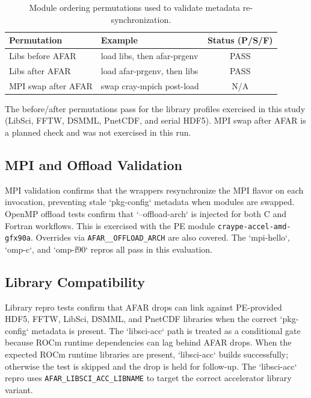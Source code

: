 \begin{table}[t]
  \centering
  \small
  \setlength{\tabcolsep}{4pt}
  \caption{Module ordering permutations used to validate metadata
  re-synchronization.}
  \label{tab:ordering}
  \begin{tabular}{l l c}
    \hline
    Permutation & Example & Status (P/S/F) \\
    \hline
    Libs before AFAR & load libs, then afar-prgenv & PASS \\
    Libs after AFAR & load afar-prgenv, then libs & PASS \\
    MPI swap after AFAR & swap cray-mpich post-load & N/A \\
    \hline
  \end{tabular}
\end{table}

The before/after permutations pass for the library profiles exercised in this
study (LibSci, FFTW, DSMML, PnetCDF, and serial HDF5). MPI swap after AFAR is a
planned check and was not exercised in this run.

\subsection{MPI and Offload Validation}
\label{sec:mpi-offload}
MPI validation confirms that the wrappers resynchronize the MPI flavor on each
invocation, preventing stale `pkg-config` metadata when modules are swapped.
OpenMP offload tests confirm that `--offload-arch` is injected for both C and
Fortran workflows. This is exercised with the PE module
\texttt{craype-accel-}\allowbreak\texttt{amd-gfx90a}. Overrides via
\texttt{AFAR\_\*\_OFFLOAD\_ARCH} are also covered. The `mpi-hello`, `omp-c`, and
`omp-f90` repros all pass in this evaluation.

\subsection{Library Compatibility}
\label{sec:libraries}
Library repro tests confirm that AFAR drops can link against PE-provided HDF5,
FFTW, LibSci, DSMML, and PnetCDF libraries when the correct `pkg-config`
metadata is present. The `libsci-acc` path is treated as a conditional gate
because ROCm runtime dependencies can lag behind AFAR drops.
When the expected ROCm runtime libraries are present, `libsci-acc` builds
successfully; otherwise the test is skipped and the drop is held for follow-up.
The `libsci-acc` repro uses \texttt{AFAR\_LIBSCI\_ACC\_LIBNAME} to target the
correct accelerator library variant.

